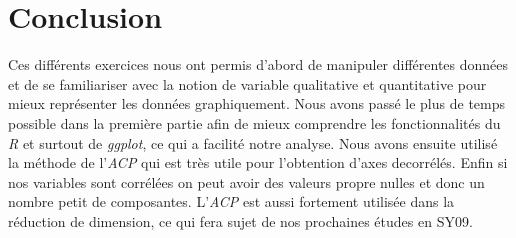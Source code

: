 \documentclass[10pt]{article}
\begin{document}
	\section{Conclusion}
	Ces différents exercices nous ont permis d'abord de manipuler différentes données et de se familiariser avec la notion de variable qualitative et quantitative pour mieux représenter les données graphiquement. Nous avons passé le plus de temps possible dans la première partie afin de mieux comprendre les fonctionnalités du \textit{R} et surtout de \textit{ggplot}, ce qui a facilité notre analyse. Nous avons ensuite utilisé la méthode de l'\textit{ACP} qui est très utile pour l'obtention d'axes decorrélés. Enfin si nos variables sont corrélées on peut avoir des valeurs propre nulles et donc un nombre petit de composantes. L'\textit{ACP} est aussi fortement utilisée dans la réduction de dimension, ce qui fera sujet de nos prochaines études en SY09. 
\end{document}

